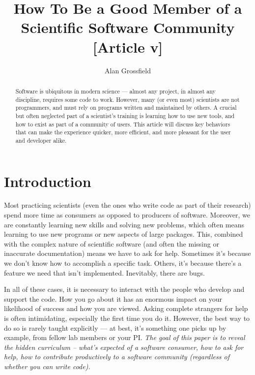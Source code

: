 \documentclass[9pt,training,ASAPversion]{livecoms}
\title{How To Be a Good Member of a Scientific Software Community [Article v\versionnumber]}
\author[1*]{Alan Grossfield}
\affil[1]{University of Rochester Medical Center, Department of Biochemistry and Biophysics}
\begin{document}
\begin{frontmatter}
\maketitle

\begin{abstract}

Software is ubiquitous in modern science --- almost any project, in almost any
discipline, requires some code to work. However, many (or even most) scientists
are not programmers, and must rely on programs written and maintained by others.
A crucial but often neglected part of a scientist's training is
learning how to use new tools, and how to exist as part of a community of users.
This article will discuss key behaviors that can make the experience quicker,
more efficient, and more pleasant for the user and developer alike.


\end{abstract}

\end{frontmatter}




\section{Introduction}

Most practicing scientists (even the ones who write code as part of their
research) spend more time as consumers as opposed to producers of software.
Moreover, we are constantly learning new skills and solving new problems, which
often means learning to use new programs or new aspects of large packages. This,
combined with the complex nature of scientific software (and often the missing
or inaccurate documentation) means we have to ask for help.  Sometimes it's
because we don't know how to accomplish a specific task. Others, it's because
there's a feature we need that isn't implemented. Inevitably, there are bugs.

In all of these cases, it is necessary to interact with the people who develop
and support the code. How you go about it has an enormous impact on your
likelihood of success and how you are viewed. Asking complete strangers for help
is often intimidating, especially the first time you do it. However, the best
way to do so is rarely taught explicitly --- at best, it's something one picks
up by example, from fellow lab members or your PI.  \emph{The goal of this
paper is to reveal the hidden curriculum -- what's expected of a software
consumer, how to ask for help, how to contribute productively to a software
community (regardless of whether you can write code).}
\end{document}
